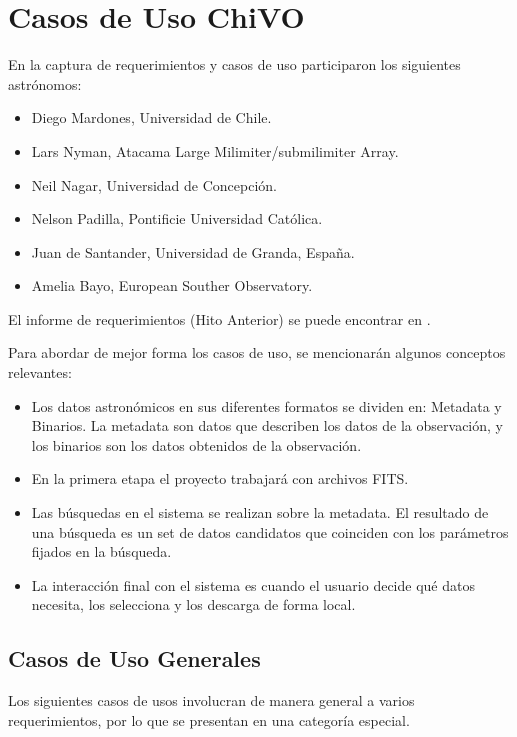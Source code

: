 \section{Casos de Uso ChiVO}
\noindent En la captura de requerimientos y casos de uso participaron los siguientes
astrónomos:
\begin{itemize}
	\item Diego Mardones, Universidad de Chile.
	\item Lars Nyman, Atacama Large Milimiter/submilimiter Array.
	\item Neil Nagar, Universidad de Concepción.
	\item Nelson Padilla, Pontificie Universidad Católica. 
	\item Juan de Santander, Universidad de Granda, España.
	\item Amelia Bayo, European Souther Observatory.
\end{itemize}

\noindent El informe de requerimientos (Hito Anterior) se puede encontrar en
\cite{hrequerimientos}.

\noindent Para abordar de mejor forma los casos de uso, se mencionarán algunos
conceptos relevantes:
\begin{itemize}
	\item Los datos astronómicos en sus diferentes formatos se dividen en:
Metadata y Binarios. La metadata son datos que describen los datos de la
observación, y los binarios son los datos obtenidos de la observación.
	\item En la primera etapa el proyecto trabajará con archivos FITS.
	\item Las búsquedas en el sistema se realizan sobre la metadata. El
resultado de una búsqueda es un set de datos candidatos que coinciden con los
parámetros fijados en la búsqueda.
	\item La interacción final con el sistema es cuando el usuario decide qué
datos necesita, los selecciona y los descarga de forma local.
\end{itemize}

\subsection{Casos de Uso Generales}
Los siguientes casos de usos involucran de manera general a varios
requerimientos, por lo que se presentan en una categoría especial. 

